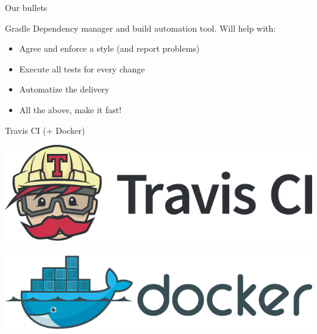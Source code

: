 \documentclass[presentation]{beamer}
\begin{document}
\begin{frame}{Our bullets}
\begin{block}{Gradle}
		Dependency manager and build automation tool. Will help with:
		\begin{itemize}
			\item Agree and enforce a style (and report problems)
			\item Execute all tests for every change
			\item Automatize the delivery
			\item All the above, make it fast!
		\end{itemize}
	\end{block}
	\begin{block}{Travis CI (+ Docker)}
		\begin{center}
			\includegraphics[height=.1\textheight]{images/travis-logo} ~ 
			\includegraphics[height=.1\textheight]{images/docker-logo} ~ 
		\end{center}


\end{block}
\end{frame}
\end{document}

